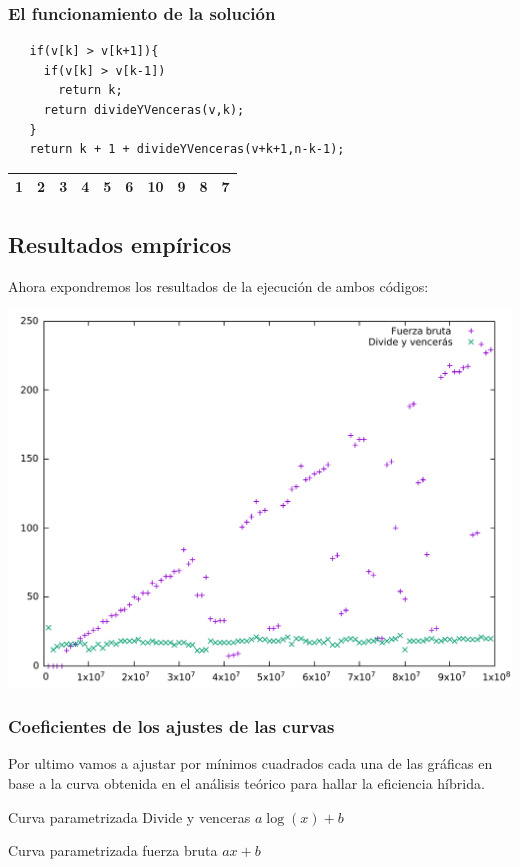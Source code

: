 \documentclass[compress]{beamer}
\begin{document}
\begin{frame}[fragile]
  \frametitle{El funcionamiento de la solución}
  \begin{lstlisting}
   if(v[k] > v[k+1]){
     if(v[k] > v[k-1]) 
       return k;
     return divideYVenceras(v,k);
   }
   return k + 1 + divideYVenceras(v+k+1,n-k-1);
\end{lstlisting}

\begin{center}
  \begin{tabular}{|l|l|l|l|l|l|l|l|l|l|}
\hline
1 & 2 & 3 & 4 & 5 & 6 & 10 & 9 & 8 & 7 \\ \hline
\end{tabular}
\end{center}
\end{frame}



\subsection{Resultados empíricos}
\begin{frame}
	Ahora expondremos los resultados de la ejecución de ambos códigos:\\
	\begin{center}
	\includegraphics[scale=0.37]{imagen1.pdf}
\end{center}
\end{frame}
	
\begin{frame}
\frametitle{Coeficientes de los ajustes de las curvas}
Por ultimo vamos a ajustar por mínimos cuadrados cada una de las gráficas en base a la curva obtenida en el análisis teórico para hallar la eficiencia híbrida.

\begin{block}{Curva parametrizada Divide y venceras}
	$a\log(x)+b$
\end{block}

\begin{block}{Curva parametrizada fuerza bruta}
	$ax+b$
\end{block}
\end{frame}
\end{document}
